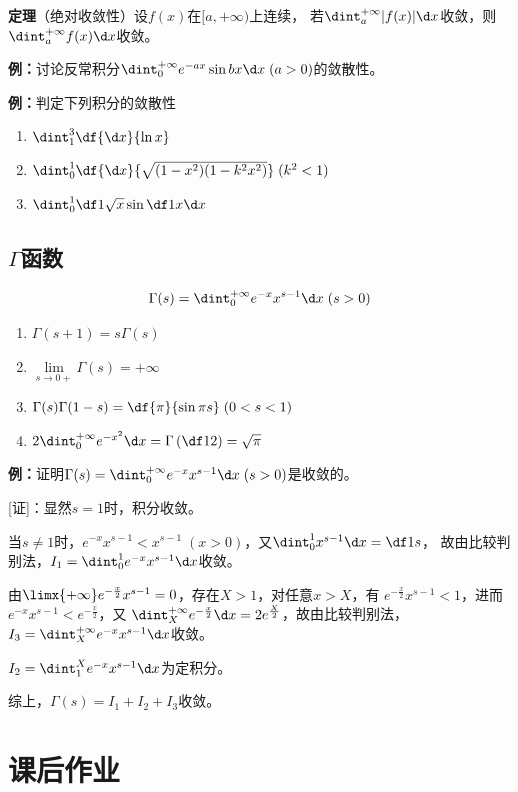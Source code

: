 {\bf 定理}（绝对收敛性）设$f(x)$在$[a,+\infty)$上连续，
若$\dint_a^{+\infty}|f(x)|\d x$收敛，则
$\dint_a^{+\infty}f(x)\d x$收敛。

{\bf 例：}讨论反常积分$\dint_0^{+\infty}e^{-ax}\sin bx\d x\;(a>0)$的敛散性。

{\bf 例：}判定下列积分的敛散性
\begin{enumerate}[(1)]
  \setlength{\itemindent}{1cm}
  \item $\dint_1^3\df{\d x}{\ln x}$ 
  \item $\dint_0^1\df{\d x}{\sqrt{(1-x^2)(1-k^2x^2)}}\;(k^2<1)$ 
  \item $\dint_0^1\df 1{\sqrt{x}}\sin\df 1x\d x$
\end{enumerate}

\subsection{$\Gamma$函数}

$${\Gamma(s)=\dint_0^{+\infty}e^{-x}x^{s-1}\d x\;(s>0)}$$

\begin{enumerate}[(1)]
  \setlength{\itemindent}{1cm}
  \item $\Gamma(s+1)=s\Gamma(s)$ 
  \item $\lim\limits_{s\to 0+}\Gamma(s)= +\infty$ 
  \item $\Gamma(s)\Gamma(1-s)=\df{\pi}{\sin \pi s}\;(0<s<1)$ 
  \item $2\dint_0^{+\infty}e^{-x^2}\d x=\Gamma\left(\df 12\right)=\sqrt{\pi}$
\end{enumerate}

{\bf 例：}证明$\Gamma(s)=\dint_0^{+\infty}e^{-x}x^{s-1}\d x\;(s>0)$是收敛的。

[证]：显然$s=1$时，积分收敛。

当$s\ne1$时，$e^{-x}x^{s-1}<x^{s-1}\;(x>0)$，又$\dint_0^1x^{s-1}\d x=\df1s$，
故由比较判别法，$I_1=\dint_0^1e^{-x}x^{s-1}\d x$收敛。

由$\limx{+\infty}e^{-\frac x2}x^{s-1}=0$，存在$X>1$，对任意$x>X$，有
$e^{-\frac x2}x^{s-1}<1$，进而$e^{-x}x^{s-1}<e^{-\frac x2}$，又
$\dint_X^{+\infty}e^{-\frac x2}\d x=2e^{\frac X2}$，故由比较判别法，
$I_3=\dint_X^{+\infty}e^{-x}x^{s-1}\d x$收敛。

$I_2=\dint_1^Xe^{-x}x^{s-1}\d x$为定积分。

综上，$\Gamma(s)=I_1+I_2+I_3$收敛。

\newpage

\section*{课后作业}

